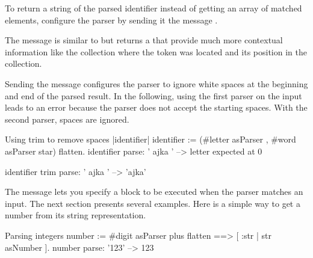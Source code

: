 \documentclass[a4paper,10pt,twoside]{book}
\begin{document}
To return a string of the parsed identifier instead of getting an
array of matched elements, configure the parser by sending it the
message .



The message  is similar to  but returns a
 that provide much more contextual information like the
collection where the token was located and its position in the
collection.

Sending the message  configures the parser to ignore
white spaces at the beginning and end of the parsed result. In the
following, using the first parser on the input leads to an error
because the parser does not accept the starting spaces. With the
second parser, spaces are ignored.

\begin{script}{Using trim to remove spaces }
|identifier|
identifier := (#letter asParser , #word asParser star) flatten.
identifier parse: '  ajka   '          -->  letter expected at 0

identifier trim parse: '  ajka   '          --> 'ajka'
\end{script}

The message \ppmthind{==>} lets you specify a block to be executed
when the parser matches an input. The next section presents several
examples. Here is a simple way to get a number from its string
representation.

\begin{script}[number]{Parsing integers}
number :=  #digit asParser plus flatten ==> [ :str | str asNumber ].
number parse: '123'                     --> 123
\end{script}

\end{document}
